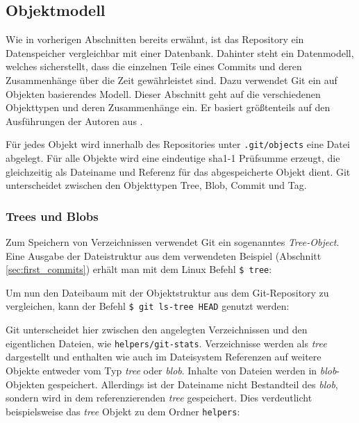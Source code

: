\subsection{Objektmodell}\label{sec:objectmodel}
Wie in vorherigen Abschnitten bereits erwähnt, ist das Repository ein
Datenspeicher vergleichbar mit einer Datenbank. Dahinter steht ein Datenmodell,
welches sicherstellt, dass die einzelnen Teile eines Commits und deren
Zusammenhänge über die Zeit gewährleistet sind. Dazu verwendet Git ein auf
Objekten basierendes Modell. Dieser Abschnitt geht auf die verschiedenen
Objekttypen und deren Zusammenhänge ein. Er basiert größtenteils auf den
Ausführungen der Autoren aus \cite[S.~49-59]{gitosp}.

Für jedes Objekt wird innerhalb des Repositories unter \texttt{.git/objects}
eine Datei abgelegt. Für alle Objekte wird eine eindeutige \acrshort{sha1}-1
Prüfsumme erzeugt, die gleichzeitig als Dateiname und Referenz für das
abgespeicherte Objekt dient. Git unterscheidet zwischen den Objekttypen Tree,
Blob, Commit und Tag.

\subsubsection{Trees und Blobs}\label{sec:treeblobobjects}
Zum Speichern von Verzeichnissen verwendet Git ein sogenanntes
\textit{Tree-Object}. Eine Ausgabe der Dateistruktur aus dem verwendeten
Beispiel (Abschnitt \ref{sec:first_commits}) erhält man mit dem Linux Befehl
\texttt{\$ tree}:


Um nun den Dateibaum mit der Objektstruktur aus dem Git-Repository zu
vergleichen, kann der Befehl \texttt{\$ git ls-tree HEAD} genutzt werden:


Git unterscheidet hier zwischen den angelegten Verzeichnissen und den
eigentlichen Dateien, wie \texttt{helpers/git-stats}. Verzeichnisse werden als
\textit{tree} dargestellt und enthalten wie auch im Dateisystem Referenzen auf
weitere Objekte entweder vom Typ \textit{tree} oder \textit{blob}.  Inhalte von
Dateien werden in \textit{blob}-Objekten gespeichert. Allerdings ist der
Dateiname nicht Bestandteil des \textit{blob}, sondern wird in dem
referenzierenden \textit{tree} gespeichert. Dies verdeutlicht beispielsweise
das \textit{tree} Objekt zu dem Ordner \texttt{helpers}:

